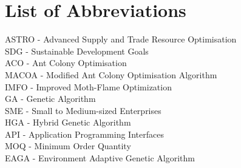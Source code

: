 \chapter*{List of Abbreviations}

ASTRO - Advanced Supply and Trade Resource Optimisation \\
SDG - Sustainable Development Goals \\
ACO - Ant Colony Optimisation \\
MACOA - Modified Ant Colony Optimisation Algorithm\\
IMFO - Improved Moth-Flame Optimization \\
GA - Genetic Algorithm \\
SME - Small to Medium-sized Enterprises \\
HGA - Hybrid Genetic Algorithm \\
API - Application Programming Interfaces \\
MOQ - Minimum Order Quantity \\
EAGA - Environment Adaptive Genetic Algorithm \\